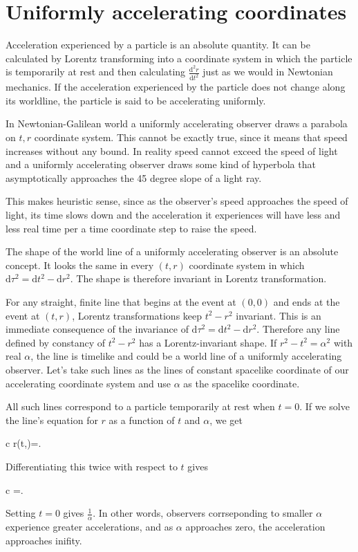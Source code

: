 \documentclass[11pt,oneside%
]{memoir}
\newenvironment{eqna}{\begin{IEEEeqnarray*}{c}}{\end{IEEEeqnarray*}\ignorespacesafterend}
\newcommand{\der}[2]{\frac{\dd#1}{\dd#2}}
\newcommand{\dd}{\mathrm{d}}
\begin{document}
\section{Uniformly accelerating coordinates}

Acceleration experienced by a particle is an absolute quantity. It can be calculated by Lorentz transforming into a coordinate system in which the particle is temporarily at rest and then calculating \(\der{^2r}{t^2}\) just as we would in Newtonian mechanics. If the acceleration experienced by the particle does not change along its worldline, the particle is said to be accelerating uniformly.


In Newtonian-Galilean world a uniformly accelerating observer draws a parabola on \(t,r\) coordinate system. This cannot be exactly true, since it means that speed increases without any bound. In reality speed cannot exceed the speed of light and a uniformly accelerating observer draws some kind of hyperbola that asymptotically approaches the 45 degree slope of a light ray.

This makes heuristic sense, since as the observer's speed approaches the speed of light, its time slows down and the acceleration it experiences will have less and less real time per a time coordinate step to raise the speed.

The shape of the world line of a uniformly accelerating observer is an absolute concept. It looks the same in every \((t,r)\) coordinate system in which \(\dd\tau^2=\dd t^2-\dd r^2\). The shape is therefore invariant in Lorentz transformation.

For any straight, finite line that begins at the event at \((0,0)\) and ends at the event at \((t,r)\), Lorentz transformations keep \(t^2-r^2\) invariant. This is an immediate consequence of the invariance of \(\dd\tau^2=\dd t^2-\dd r^2\). Therefore any line defined by constancy of \(t^2-r^2\) has a Lorentz-invariant shape. If \(r^2-t^2=\alpha^2\) with real \(\alpha\), the line is timelike and could be a world line of a uniformly accelerating observer. Let's take such lines as the lines of constant spacelike coordinate of our accelerating coordinate system and use \(\alpha\) as the spacelike coordinate.

All such lines correspond to a particle temporarily at rest when \(t=0\). If we solve the line's equation for \(r\) as a function of \(t\) and \(\alpha\), we get
\begin{eqna}
r(t,\alpha)=.
\end{eqna}
Differentiating this twice with respect to \(t\) gives
\begin{eqna}
\der{^2r}{t^2}=.
\end{eqna}
Setting \(t=0\) gives \(\frac{1}{\alpha}\). In other words, observers corrseponding to smaller \(\alpha\) experience greater accelerations, and as \(\alpha\) approaches zero, the acceleration approaches inifity.
\end{document}
